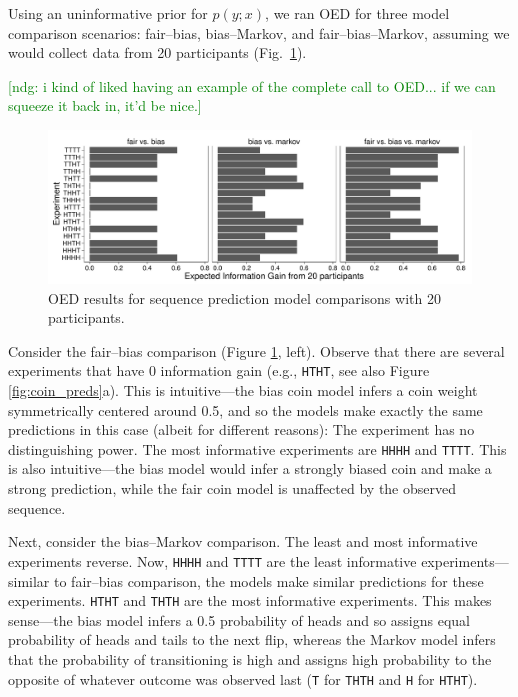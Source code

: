\documentclass{article}
\newcommand{\ndg}[1]{\textcolor{Green}{[ndg: #1]}}
\begin{document}
Using an uninformative prior for $p(y; x)$, we ran OED for three model comparison scenarios: fair--bias, bias--Markov, and fair--bias--Markov, assuming we would collect data from 20 participants (Fig.~\ref{fig:run-coin}).

\ndg{i kind of liked having an example of the complete call to OED... if we can squeeze it back in, it'd be nice.}

\begin{figure}[h]
\includegraphics[width=\columnwidth]{img/coin_eig_n20_ignorance.pdf}
\caption{OED results for sequence prediction model comparisons with 20 participants.}
\label{fig:run-coin}
\end{figure}
Consider the fair--bias comparison (Figure \ref{fig:run-coin}, left).
Observe that there are several experiments that have 0 information gain (e.g., \lstinline{HTHT}, see also Figure \ref{fig:coin_preds}a).
This is intuitive---the bias coin model infers a coin weight symmetrically centered around 0.5, and so the models make exactly the same predictions in this case (albeit for different reasons): The experiment has no distinguishing power.
The most informative experiments are \lstinline{HHHH} and \lstinline{TTTT}.
This is also intuitive---the bias model would infer a strongly biased coin and make a strong prediction, while the fair coin model is unaffected by the observed sequence.

Next, consider the bias--Markov comparison.
The least and most informative experiments reverse.
Now, \lstinline{HHHH} and \lstinline{TTTT} are the least informative experiments---similar to fair--bias comparison, the models make similar predictions for these experiments.
\lstinline{HTHT} and \lstinline{THTH} are the most informative experiments.
This makes sense---the bias model infers a 0.5 probability of heads and so assigns equal probability of heads and tails to the next flip, whereas the Markov model infers that the probability of transitioning is high and assigns high probability to the opposite of whatever outcome was observed last (\lstinline{T} for \lstinline{THTH} and \lstinline{H} for \lstinline{HTHT}).
\end{document}

